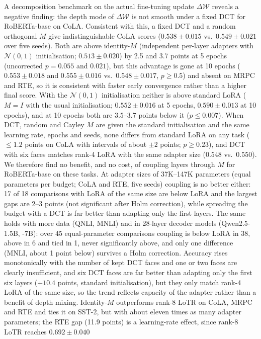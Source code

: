 \documentclass{article}
\newcommand{\DeltaW}{\Delta\mathcal{W}}
\theoremstyle{plain}
\begin{document}
A decomposition benchmark on the actual fine-tuning update $\DeltaW$
reveals a negative finding: the depth mode of $\DeltaW$ is not
smooth under a fixed DCT for RoBERTa-base on CoLA.
Consistent with this, a fixed DCT and a random orthogonal $M$ give indistinguishable CoLA scores
($0.538\pm0.015$ vs.\ $0.549\pm0.021$ over five seeds).
Both are above identity-$M$ (independent per-layer adapters with $\mathcal{N}(0,1)$ initialisation;
$0.513\pm0.020$) by 2.5 and 3.7 points at 5 epochs (uncorrected $p=0.055$ and $0.021$), but this advantage is gone at 10 epochs
($0.553\pm0.018$ and $0.555\pm0.016$ vs.\ $0.548\pm0.017$, $p\ge0.5$) and absent on MRPC and RTE, so it is consistent with faster early convergence rather than a higher final score.
With the $\mathcal{N}(0,1)$ initialisation neither is above standard LoRA ($M=I$ with the usual initialisation; $0.552\pm0.016$ at 5 epochs, $0.590\pm0.013$ at 10 epochs), and at 10 epochs both are $3.5$--$3.7$ points below it ($p\le0.007$).
When DCT, random and Cayley $M$ are given the standard initialisation and the same learning rate, epochs and seeds, none differs from standard LoRA on any task
($\le1.2$ points on CoLA with intervals of about $\pm2$ points; $p\ge0.23$), and DCT with six faces matches rank-4 LoRA with the same adapter size ($0.548$ vs.\ $0.550$).
We therefore find no benefit, and no cost, of coupling layers through $M$ for RoBERTa-base on these tasks.
At adapter sizes of 37K--147K parameters (equal parameters per budget; CoLA and RTE, five seeds) coupling is no better either: 17 of 18 comparisons with LoRA of the same size are below LoRA
and the largest gaps are 2--3 points (not significant after Holm correction), while spreading the budget with a DCT is far better than adapting only the first layers.
The same holds with more data (QNLI, MNLI) and in 28-layer decoder models (Qwen2.5-1.5B, -7B): over 45 equal-parameter comparisons coupling is below LoRA in 38, above in 6 and tied in 1, never significantly above,
and only one difference (MNLI, about 1 point below) survives a Holm correction.
Accuracy rises monotonically with the number of kept DCT faces and one or two faces are clearly insufficient, and six DCT faces are far better than adapting only the first six layers ($+10.4$ points, standard initialisation), but they only match rank-4 LoRA of the same size, so the trend reflects capacity of the adapter rather than a benefit of depth mixing.
Identity-$M$ outperforms rank-8 LoTR on CoLA, MRPC and RTE and ties it on SST-2, but with about eleven times as many
adapter parameters; the RTE gap (11.9 points) is a learning-rate effect, since rank-8 LoTR reaches $0.692\pm0.040$
\end{document}
